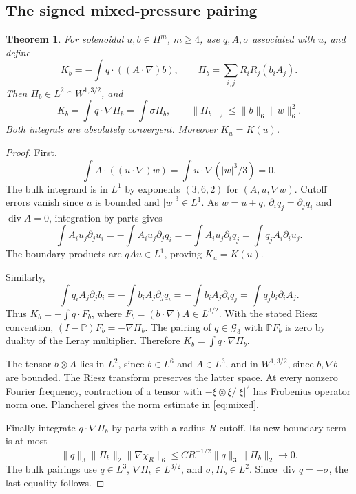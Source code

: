 \documentclass[11pt,a4paper]{article}
\newtheorem{theorem}{Theorem}[section]
\theoremstyle{definition}
\theoremstyle{remark}
\newcommand{\G}{\mathcal G_3}
\newcommand{\PP}{\mathbb P}
\newcommand{\norm}[1]{\lVert #1\rVert}
\newcommand{\diver}{\operatorname{div}}
\numberwithin{equation}{section}
\begin{document}
\subsection{The signed mixed-pressure pairing}
\begin{theorem}\label{thm:mixed}
For solenoidal \(u,b\in H^m\), \(m\ge4\), use \(q,A,\sigma\) associated with \(u\), and define
\[
K_b=-\int q\cdot((A\cdot\nabla)b),
\qquad \Pi_b=\sum_{i,j}R_iR_j(b_iA_j).
\]
Then \(\Pi_b\in L^2\cap W^{1,3/2}\), and
\begin{equation}\label{eq:mixed}
K_b=\int q\cdot\nabla\Pi_b=\int\sigma\Pi_b,
\qquad
\norm{\Pi_b}_2\le\norm b_6\norm w_6^2.
\end{equation}
Both integrals are absolutely convergent. Moreover \(K_u=K(u)\).
\end{theorem}
\begin{proof}
First,
\[
\int A\cdot((u\cdot\nabla)w)
=\int u\cdot\nabla(|w|^3/3)=0.
\]
The bulk integrand is in \(L^1\) by exponents \((3,6,2)\) for \((A,u,\nabla w)\). Cutoff errors vanish since \(u\) is bounded and \(|w|^3\in L^1\). As \(w=u+q\), \(\partial_iq_j=\partial_jq_i\) and \(\diver A=0\), integration by parts gives
\[
\int A_i u_j\partial_ju_i
=-\int A_i u_j\partial_jq_i
=-\int A_i u_j\partial_iq_j
=\int q_j A_i\partial_i u_j.
\]
The boundary products are \(qAu\in L^1\), proving \(K_u=K(u)\).

Similarly,
\[
\int q_iA_j\partial_jb_i
=-\int b_iA_j\partial_jq_i
=-\int b_iA_j\partial_iq_j
=\int q_jb_i\partial_iA_j.
\]
Thus \(K_b=-\int q\cdot F_b\), where \(F_b=(b\cdot\nabla)A\in L^{3/2}\). With the stated Riesz convention,
\((I-\PP)F_b=-\nabla\Pi_b\).
The pairing of \(q\in\G\) with \(\PP F_b\) is zero by duality of the Leray multiplier. Therefore \(K_b=\int q\cdot\nabla\Pi_b\).

The tensor \(b\otimes A\) lies in \(L^2\), since \(b\in L^6\) and \(A\in L^3\), and in \(W^{1,3/2}\), since \(b,\nabla b\) are bounded. The Riesz transform preserves the latter space. At every nonzero Fourier frequency, contraction of a tensor with \(-\xi\otimes\xi/|\xi|^2\) has Frobenius operator norm one. Plancherel gives the norm estimate in \eqref{eq:mixed}.

Finally integrate \(q\cdot\nabla\Pi_b\) by parts with a radius-\(R\) cutoff. Its new boundary term is at most
\[
\norm q_3\norm{\Pi_b}_2\norm{\nabla\chi_R}_6
\le CR^{-1/2}\norm q_3\norm{\Pi_b}_2\longrightarrow0.
\]
The bulk pairings use \(q\in L^3\), \(\nabla\Pi_b\in L^{3/2}\), and \(\sigma,\Pi_b\in L^2\). Since \(\diver q=-\sigma\), the last equality follows.
\end{proof}
\end{document}
